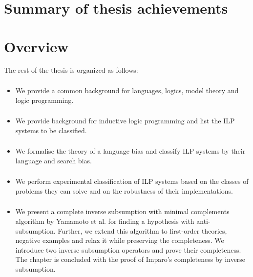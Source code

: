 \section{Summary of thesis achievements}


\section{Overview}
The rest of the thesis is organized as follows:
\begin{itemize}
\item \subsubsection{} We provide a common background for languages, logics, model theory and logic programming.
\item \subsubsection{}
We provide background for inductive logic programming and list the ILP systems to be classified.
\item \subsubsection{}
We formalise the theory of a language bias and classify ILP systems by their language and search bias.
\item \subsubsection{}
We perform experimental classification of ILP systems based on the classes of problems they can solve and on the robustness of their implementations.
\item \subsubsection{}
We present a complete inverse subsumption with minimal complements algorithm by Yamamoto et al. \cite{yamamoto2012inverse} for finding a hypothesis with anti-subsumption. Further, we extend this algorithm to first-order theories, negative examples and relax it while preserving the completeness. We introduce two inverse subsumption operators and prove their completeness. The chapter is concluded with the proof of Imparo's completeness by inverse subsumption.

\end{itemize}

